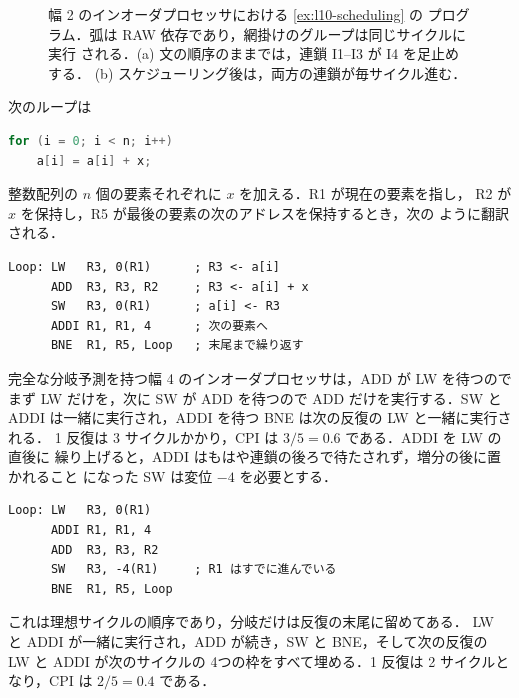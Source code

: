 \documentclass[../main.tex]{subfiles}
\begin{document}
\begin{figure}[htbp]
  \centering
  
  \caption{幅 2 のインオーダプロセッサにおける \cref{ex:l10-scheduling} の
    プログラム．弧は RAW 依存であり，網掛けのグループは同じサイクルに実行
    される．(a) 文の順序のままでは，連鎖 I1--I3 が I4 を足止めする．
    (b) スケジューリング後は，両方の連鎖が毎サイクル進む．}
  \label{fig:l10-scheduling}
\end{figure}

\begin{example}
  \label{ex:l10-loop}
  次のループは
  \begin{lstlisting}[language=C, numbers=none]
for (i = 0; i < n; i++)
    a[i] = a[i] + x;
\end{lstlisting}
  整数配列の $n$ 個の要素それぞれに $x$ を加える．R1 が現在の要素を指し，
  R2 が $x$ を保持し，R5 が最後の要素の次のアドレスを保持するとき，次の
  ように翻訳される．
  \begin{lstlisting}[language={[x86masm]Assembler}, numbers=none]
Loop: LW   R3, 0(R1)      ; R3 <- a[i]
      ADD  R3, R3, R2     ; R3 <- a[i] + x
      SW   R3, 0(R1)      ; a[i] <- R3
      ADDI R1, R1, 4      ; 次の要素へ
      BNE  R1, R5, Loop   ; 末尾まで繰り返す
\end{lstlisting}
  完全な分岐予測を持つ幅 4 のインオーダプロセッサは，ADD が LW を待つので
  まず LW だけを，次に SW が ADD を待つので ADD だけを実行する．SW と ADDI
  は一緒に実行され，ADDI を待つ BNE は次の反復の LW と一緒に実行される．
  1 反復は 3 サイクルかかり，CPI は $3/5 = 0.6$ である．ADDI を LW の直後に
  繰り上げると，ADDI はもはや連鎖の後ろで待たされず，増分の後に置かれること
  になった SW は変位 $-4$ を必要とする．
  \begin{lstlisting}[language={[x86masm]Assembler}, numbers=none]
Loop: LW   R3, 0(R1)
      ADDI R1, R1, 4
      ADD  R3, R3, R2
      SW   R3, -4(R1)     ; R1 はすでに進んでいる
      BNE  R1, R5, Loop
\end{lstlisting}
  これは理想サイクルの順序であり，分岐だけは反復の末尾に留めてある．%
  LW と
  ADDI が一緒に実行され，ADD が続き，SW と BNE，そして次の反復の LW と ADDI
  が次のサイクルの 4つの枠をすべて埋める．1 反復は 2 サイクルとなり，CPI は
  $2/5 = 0.4$ である．
\end{example}
\end{document}
